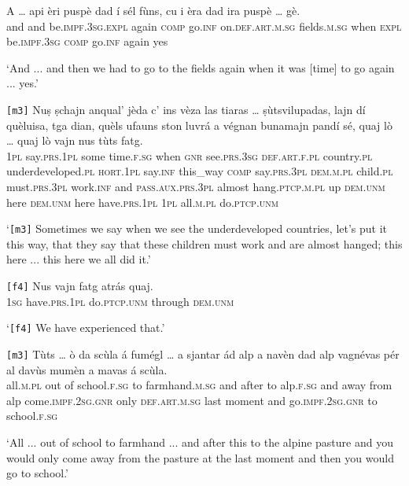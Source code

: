 \begin{linenumbers}
	\gll A … api èri puspè dad í sél fùns, cu i èra dad ira puspè … gè.\\
	and {} and be.\textsc{impf.3sg.expl} again \textsc{comp} go.\textsc{inf} on.\textsc{def.art.m.sg} fields.\textsc{m.sg} when \textsc{expl} be.\textsc{impf.3sg} \textsc{comp} go.\textsc{inf} again {} yes\\
\end{linenumbers}
\medskip
\glt `And ... and then we had to go to the fields again when it was [time] to go again ... yes.'
\medskip

\begin{linenumbers}
	\gll \texttt{[m3]} Nuṣ ṣchajn anqual’ jèda c’ ins vèza las tiaras … ṣùtsvilupadas, lajn dí quèluisa, tga dian, quèls ufauns ston luvrá a végnan bunamajn pandí sé, quaj lò … quaj lò vajn nus tùts fatg.\\
{} \textsc{1pl} say.\textsc{prs.1pl} some time.\textsc{f.sg} when \textsc{gnr} see.\textsc{prs.3sg} \textsc{def.art.f.pl} country.\textsc{pl} {} underdeveloped.\textsc{pl} \textsc{hort.1pl} say.\textsc{inf} this\_way \textsc{comp} say.\textsc{prs.3pl} \textsc{dem.m.pl} child.\textsc{pl} must.\textsc{prs.3pl} work.\textsc{inf} and \textsc{pass.aux.prs.3pl} almost hang.\textsc{ptcp.m.pl} up \textsc{dem.unm} here {} \textsc{dem.unm} here have.\textsc{prs.1pl} \textsc{1pl} all.\textsc{m.pl} do.\textsc{ptcp.unm}	\\
\end{linenumbers}
\medskip
\glt `\texttt{[m3]} Sometimes we say when we see the underdeveloped countries, let's put it this way, that they say that these children must work and are almost hanged; this here ... this here we all did it.'
\medskip

\begin{linenumbers}
	\gll \texttt{[f4]} Nus vajn fatg atrás quaj.\\
	{} \textsc{1sg} have.\textsc{prs.1pl} do\textsc{.ptcp.unm} through \textsc{dem.unm}\\
\end{linenumbers}
\medskip
\glt `\texttt{[f4]} We have experienced that.'
\medskip

\begin{linenumbers}
	\gll  \texttt{[m3]} Tùts … ò da scùla á fumégl … a sjantar ád alp a navèn dad alp vagnévas pér al davùs mumèn a mavas á scùla. \\
{}	all.\textsc{m.pl} {} out of school.\textsc{f.sg} to farmhand.\textsc{m.sg} {} and after to alp.\textsc{f.sg} and away from alp come.\textsc{impf.2sg.gnr} only \textsc{def.art.m.sg} last moment and go.\textsc{impf.2sg.gnr} to school.\textsc{f.sg}\\
\end{linenumbers}
\medskip
\glt `All ... out of school to farmhand ... and after this to the alpine pasture and you would only come away from the pasture at the last moment and then you would go to school.'
\medskip

